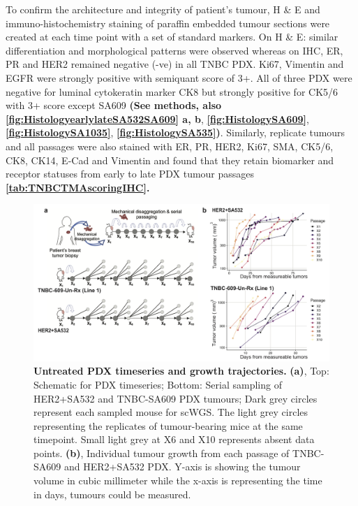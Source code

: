 To confirm the architecture and integrity of patient's tumour, H \& E and immuno-histochemistry staining of paraffin embedded tumour sections were created at each time point with a set of standard markers. On H \& E: similar differentiation and morphological patterns were observed whereas on IHC, ER, PR and HER2 remained negative (-ve) in all TNBC PDX. Ki67, Vimentin and EGFR were strongly positive with semiquant score of 3+. All of three PDX were negative for luminal cytokeratin marker CK8 but strongly positive for CK5/6 with 3+ score except SA609 \textbf{(See methods, also {\autoref{fig:HistologyearlylateSA532SA609}} a, b},  \textbf{\autoref{fig:HistologySA609}},  \textbf{\autoref{fig:HistologySA1035}}, \textbf{\autoref{fig:HistologySA535})}. 
Similarly, replicate tumours and all passages were also stained with ER, PR, HER2,
Ki67, SMA, CK5/6, CK8, CK14, E-Cad and Vimentin and found that they retain biomarker and receptor statuses from early to late PDX tumour passages \textbf{\autoref{tab:TNBCTMAscoringIHC}.}




 \begin{figure}
\centering
\includegraphics[width=\textwidth]{Figures/chap4/Untreatedgrowthcurves.png}
	
\caption[Untreated PDX timeseries and growth trajectories]
	{\small
	\textbf{Untreated PDX timeseries and growth trajectories.}
	    \textbf{(a)}, Top: Schematic for PDX timeseries; Bottom: Serial sampling of HER2+SA532 and TNBC-SA609 PDX tumours;
Dark grey circles represent each sampled mouse for scWGS. The light grey circles representing the replicates of tumour-bearing mice at the same timepoint. Small light grey at X6 and X10 represents absent data points.
	    \textbf{(b)}, Individual tumour growth from each passage of TNBC-SA609 and HER2+SA532 PDX. Y-axis is showing the tumour volume in cubic millimeter while the x-axis is representing the time in days, tumours could be measured.}
	\label{fig:Untreatedgrowthcurves}
\end{figure}

